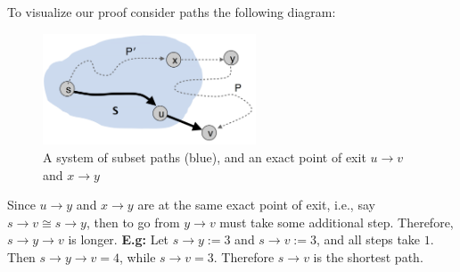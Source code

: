 \newpage

\noindent
To visualize our proof consider paths the following diagram:
\begin{figure}[h]
    \begin{center}
      \includegraphics[height=1.3in]{./Sections/dstra/dstra_proof.png}
    \end{center}
     \caption{A system of subset paths (blue), and an exact point of exit $u\to v$ and $x\to y$}\label{fig:dstra_proof}
\end{figure}

\noindent
Since $u\to y$ and $x\to y$ are at the same exact point of exit, i.e., say $s\to v\cong s\to y$, then to go from $y\to v$ must take some additional step.
Therefore, $s\to y\to v$ is longer. \textbf{E.g:} Let $s\to y:= 3$ and $s\to v:= 3$, and all steps take $1$.
Then $s\to y\to v = 4$, while $s\to v = 3$. Therefore $s\to v$ is the shortest path.\\

